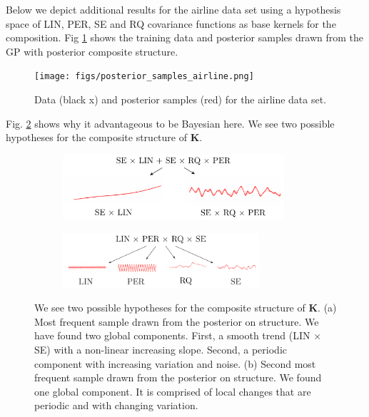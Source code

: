 Below we depict additional results for the airline data set using a hypothesis space of LIN, PER, SE and RQ covariance functions as base kernels for the composition. Fig \ref{fig:airline1} shows the training data and posterior samples drawn from the \ac{GP} with posterior composite structure. 

\begin{figure}
\texttt{[image: figs/posterior\_samples\_airline.png]}
\caption{Data (black x) and posterior samples (red) for the airline data set.}\label{fig:airline1}
\end{figure}
Fig. \ref{fig:posterior_twosamples} shows why it advantageous to be Bayesian here. We see two possible hypotheses for the composite structure of $\mathbf{K}$. 

\begin{figure}
        \centering
        \begin{subfigure}{0.49\textwidth} \centering
                \includegraphics[width=0.9\textwidth]{figs/airline_struct_1.pdf}
        \end{subfigure}
	\begin{subfigure}{0.49\textwidth} \centering
                \includegraphics[width=0.8\textwidth]{figs/airline_struct_2.pdf}
        \end{subfigure}
        \caption{We see two possible hypotheses for the composite structure of $\mathbf{K}$. (a) Most frequent sample drawn from the posterior on structure. We have found two global components. First, a smooth trend (LIN $\times$ SE) with a non-linear increasing slope. Second, a periodic component with increasing variation and noise. (b) Second most frequent sample drawn from the posterior on structure. We found one global component. It is comprised of local changes that are periodic and with changing variation.}\label{fig:posterior_twosamples}
\end{figure}